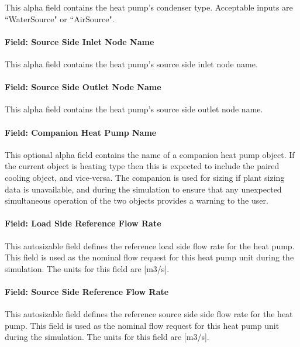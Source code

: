 This alpha field contains the heat pump's condenser type. Acceptable inputs are ``WaterSource" or ``AirSource".

\paragraph{Field: Source Side Inlet Node Name}\label{plhp_eir_inputs_source_inlet_node}

This alpha field contains the heat pump's source side inlet node name.

\paragraph{Field: Source Side Outlet Node Name}\label{plhp_eir_inputs_source_outlet_node}

This alpha field contains the heat pump's source side outlet node name.

\paragraph{Field: Companion Heat Pump Name}\label{plhp_eir_inputs_companion_name}

This optional alpha field contains the name of a companion heat pump object.  If the current object is heating type then this is expected to include the paired cooling object, and vice-versa.  The companion is used for sizing if plant sizing data is unavailable, and during the simulation to ensure that any unexpected simultaneous operation of the two objects provides a warning to the user.

\paragraph{Field: Load Side Reference Flow Rate}\label{plhp_eir_inputs_load_side_flow}

This autosizable field defines the reference load side flow rate for the heat pump.  This field is used as the nominal flow request for this heat pump unit during the simulation.  The units for this field are [m3/s].

\paragraph{Field: Source Side Reference Flow Rate}\label{plhp_eir_inputs_source_side_flow}

This autosizable field defines the reference source side side flow rate for the heat pump.  This field is used as the nominal flow request for this heat pump unit during the simulation.  The units for this field are [m3/s].


